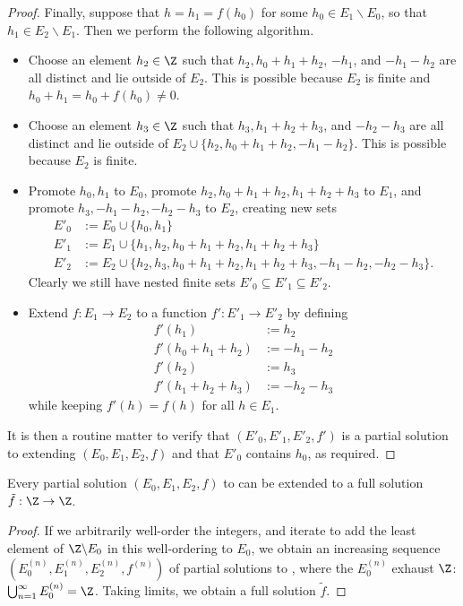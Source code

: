 \begin{proof}
Finally, suppose that $h = h_1 = f(h_0)$ for some $h_0 \in E_1 \backslash E_0$, so that $h_1 \in E_2 \backslash E_1$.  Then we perform the following algorithm.
\begin{itemize}
  \item Choose an element $h_2 \in \Z$ such that $h_2, h_0+h_1+h_2$, $-h_1$, and $-h_1-h_2$ are all distinct and lie outside of $E_2$.  This is possible because $E_2$ is finite and $h_0+h_1 = h_0+f(h_0) \neq 0$.
  \item Choose an element $h_3 \in \Z$ such that $h_3, h_1+h_2+h_3$, and $-h_2-h_3$ are all distinct and lie outside of $E_2 \cup \{h_2, h_0+h_1+h_2,-h_1-h_2\}$.  This is possible because $E_2$ is finite.
  \item Promote $h_0, h_1$ to $E_0$, promote $h_2, h_0+h_1+h_2, h_1+h_2+h_3$ to $E_1$, and promote $h_3, -h_1-h_2,-h_2-h_3$ to $E_2$, creating new sets
\begin{align*}
  E'_0 &:= E_0 \cup \{h_0, h_1 \}\\
  E'_1 &:= E_1 \cup \{h_1, h_2, h_0+h_1+h_2, h_1+h_2+h_3 \}\\
  E'_2 &:= E_2 \cup \{h_2, h_3, h_0+h_1+h_2, h_1+h_2+h_3, -h_1-h_2, -h_2-h_3\}.
\end{align*}
Clearly we still have nested finite sets $E'_0 \subseteq E'_1 \subseteq E'_2$.
\item Extend $f : E_1 \to E_2$ to a function $f': E'_1 \to E'_2$ by defining
\begin{align*}
  f'(h_1) &:= h_2 \\
  f'(h_0+h_1+h_2) &:= -h_1-h_2 \\
  f'(h_2) &:= h_3 \\
  f'(h_1+h_2+h_3) &:= -h_2-h_3
\end{align*}
while keeping $f'(h)=f(h)$ for all $h \in E_1$.
\end{itemize}
It is then a routine matter to verify that $(E'_0,E'_1,E'_2,f')$ is a partial solution to  extending $(E_0,E_1,E_2,f)$ and that $E'_0$ contains $h_0$, as required.
\end{proof}

\begin{corollary} \label{extend} Every partial solution $(E_0,E_1,E_2,f)$ to  can be extended to a full solution $\tilde f: \Z \to \Z$.
\end{corollary}

\begin{proof}
  If we arbitrarily well-order the integers, and iterate  to add the least element of $\Z \backslash E_0$ in this well-ordering to $E_0$, we obtain an increasing sequence $(E^{(n)}_0, E^{(n)}_1, E^{(n)}_2, f^{(n)})$ of partial solutions to , where the $E^{(n)}_0$ exhaust $\Z$: $\bigcup_{n=1}^\infty E^{(n)}_0 = \Z$.  Taking limits, we obtain a full solution $\tilde f$.
\end{proof}

